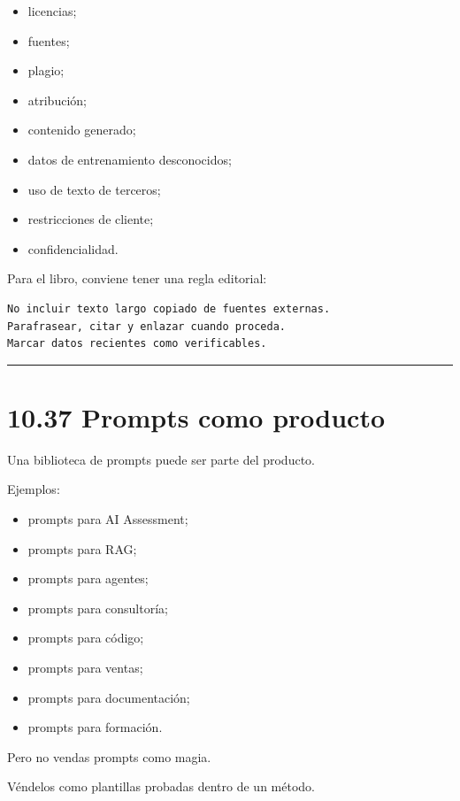 \begin{itemize}
\tightlist
\item
  licencias;
\item
  fuentes;
\item
  plagio;
\item
  atribución;
\item
  contenido generado;
\item
  datos de entrenamiento desconocidos;
\item
  uso de texto de terceros;
\item
  restricciones de cliente;
\item
  confidencialidad.
\end{itemize}

Para el libro, conviene tener una regla editorial:

\begin{lstlisting}
No incluir texto largo copiado de fuentes externas.
Parafrasear, citar y enlazar cuando proceda.
Marcar datos recientes como verificables.
\end{lstlisting}

\begin{center}\rule{0.5\linewidth}{0.5pt}\end{center}

\section{10.37 Prompts como producto}\label{prompts-como-producto}

Una biblioteca de prompts puede ser parte del producto.

Ejemplos:

\begin{itemize}
\tightlist
\item
  prompts para AI Assessment;
\item
  prompts para RAG;
\item
  prompts para agentes;
\item
  prompts para consultoría;
\item
  prompts para código;
\item
  prompts para ventas;
\item
  prompts para documentación;
\item
  prompts para formación.
\end{itemize}

Pero no vendas prompts como magia.

Véndelos como plantillas probadas dentro de un método.

